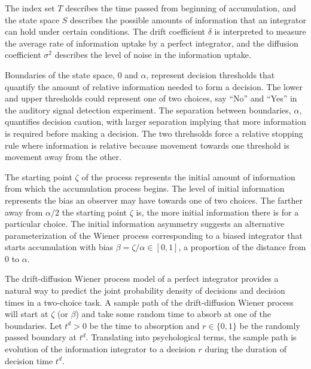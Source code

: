 \documentclass[12pt]{report}
\begin{document}
The index set $T$ describes the time passed from beginning of accumulation, and the state space $S$ describes the possible amounts of information that an integrator can hold under certain conditions.  The drift coefficient $\delta$ is interpreted  to measure the average rate of information uptake by a perfect integrator, and the
diffusion coefficient $\sigma^2$ describes the level of noise in
the information uptake. 

Boundaries of the state space, 0 and $\alpha$, represent decision thresholds that quantify the amount of relative information
needed to form a decision. The lower and upper thresholds
could represent one of two
choices, say ``No'' and ``Yes'' in the auditory signal detection
experiment.  The separation between boundaries, $\alpha$, quantifies decision
caution, with larger separation implying that more
information is required before making a decision. The two threhsolds force a relative stopping rule where information is relative because movement towards one threshold is movement away from the other.
    
The starting point $\zeta$ of the process represents the initial
amount of information from which the accumulation process
begins. The level of initial information represents the bias an
observer may have towards one of two choices. The farther away from $\alpha / 2$ the starting point $\zeta$ is, the more initial information there is for a particular choice. The initial information asymmetry suggests an alternative parameterization of the Wiener process corresponding to a biased integrator that starts accumulation with bias $\beta = \zeta / \alpha \in [0, 1]$, a proportion of the distance from 0 to $\alpha$.
    
The drift-diffusion Wiener process model of a perfect integrator provides a natural way to
predict the joint probability density of decisions and decision times in a two-choice task. A sample path of the drift-diffusion
Wiener process will start at $\zeta$ (or $\beta$) and take some random time to
absorb at one of the boundaries. Let $t^d > 0$ be the time to absorption and $r \in \{0,1\}$ be the randomly passed boundary at $t^d$. Translating into psychological terms, the sample path is evolution of the information integrator to a decision $r$ during the duration of decision time $t^d$. 
\end{document}
